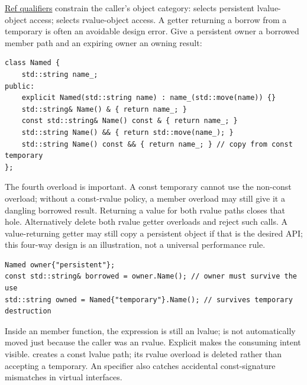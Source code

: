 \hyperref[appendix-d42039b1d6f7]{Ref qualifiers} constrain the caller's object category: \BookInlineCode{{\&}}{\&} selects persistent lvalue-object access; \BookInlineCode{{\&}{\&}}{\&\&} selects rvalue-object access. A getter returning a borrow from a temporary is often an avoidable design error. Give a persistent owner a borrowed member path and an expiring owner an owning result:

\begin{verbatim}
class Named {
    std::string name_;
public:
    explicit Named(std::string name) : name_(std::move(name)) {}
    std::string& Name() & { return name_; }
    const std::string& Name() const & { return name_; }
    std::string Name() && { return std::move(name_); }
    std::string Name() const && { return name_; } // copy from const temporary
};
\end{verbatim}

The fourth overload is important. A const temporary cannot use the non-const \BookInlineCode{{\&}{\&}}{\&\&} overload; without a const-rvalue policy, a  member overload may still give it a dangling borrowed result. Returning a value for both rvalue paths closes that hole. Alternatively delete both rvalue getter overloads and reject such calls. A value-returning getter may still copy a persistent object if that is the desired API; this four-way design is an illustration, not a universal performance rule.

\begin{verbatim}
Named owner{"persistent"};
const std::string& borrowed = owner.Name(); // owner must survive the use
std::string owned = Named{"temporary"}.Name(); // survives temporary destruction
\end{verbatim}

Inside an \BookInlineCode{{\&}{\&}}{\&\&} member function, the expression  is still an lvalue;  is not automatically moved just because the caller was an rvalue. Explicit  makes the consuming intent visible.  creates a const lvalue path; its rvalue overload is deleted rather than accepting a temporary. An  specifier also catches accidental const-signature mismatches in virtual interfaces.

